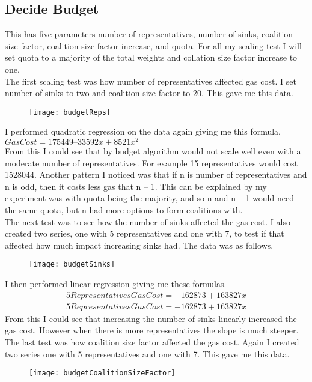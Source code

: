 \subsection{Decide Budget}
This has five parameters number of representatives, number of sinks, coalition size factor, coalition size factor increase, and quota. For all my scaling test I will set quota to a majority of the total weights and collation size factor increase to one. \\
The first scaling test was how number of representatives affected gas cost. I set number of sinks to two and coalition size factor to 20. This gave me this data. 
\begin{figure}[H]
\texttt{[image: budgetReps]}
\end{figure}
I performed quadratic regression on the data again giving me this formula. 
$Gas Cost = 175449 – 33592x + 8521x^2$ \\
From this I could see that by budget algorithm would not scale well even with a moderate number of representatives. For example 15 representatives would cost 1528044.
Another pattern I noticed was that if n is number of representatives and n is odd, then it costs less gas that n – 1. This can be explained by my experiment was with quota being the majority, and so n and n – 1 would need the same quota, but n had more options to form coalitions with. \\
The next test was to see how the number of sinks affected the gas cost. I also created two series, one with 5 representatives and one with 7, to test if that affected how much impact increasing sinks had. The data was as follows. \\
\begin{figure}[H]
\texttt{[image: budgetSinks]}
\end{figure}
I then performed linear regression giving me these formulas.
\begin{gather*}
5 Representatives Gas Cost = -162873 + 163827x \\
5 Representatives Gas Cost = -162873 + 163827x
\end{gather*}
From this I could see that increasing the number of sinks linearly increased the gas cost. However when there is more representatives the slope is much steeper. \\
The last test was how coalition size factor affected the gas cost. Again I created two series one with 5 representatives and one with 7. This gave me this data.\\
\begin{figure}[H]
\texttt{[image: budgetCoalitionSizeFactor]}
\end{figure}
